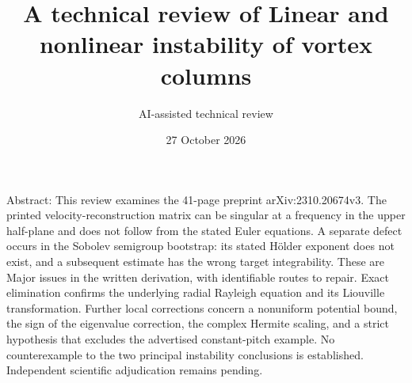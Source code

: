\documentclass[10pt]{article}
\title{A technical review of
Linear and nonlinear instability of vortex columns}
\author{AI-assisted technical review}
\date{27 October 2026}
\begin{document}
\maketitle
Abstract: This review examines the 41-page preprint arXiv:2310.20674v3. The printed velocity-reconstruction matrix can be singular at a frequency in the upper half-plane and does not follow from the stated Euler equations. A separate defect occurs in the Sobolev semigroup bootstrap: its stated Hölder exponent does not exist, and a subsequent estimate has the wrong target integrability. These are Major issues in the written derivation, with identifiable routes to repair. Exact elimination confirms the underlying radial Rayleigh equation and its Liouville transformation. Further local corrections concern a nonuniform potential bound, the sign of the eigenvalue correction, the complex Hermite scaling, and a strict hypothesis that excludes the advertised constant-pitch example. No counterexample to the two principal instability conclusions is established. Independent scientific adjudication remains pending.\par
\end{document}
